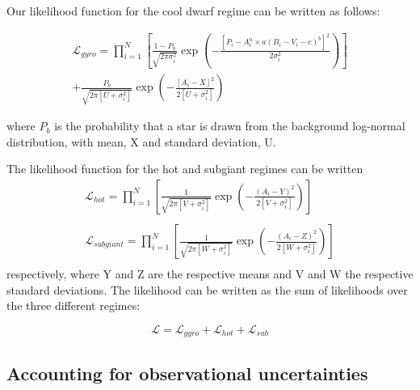 \documentclass[12pt,preprint]{aastex}
\begin{document}
Our likelihood function for the cool dwarf regime can be written as follows:


\begin{eqnarray}
	\mathcal{L}_{gyro} = \prod_{i=1}^N \left[ \frac{1-P_b}{\sqrt{2\pi\sigma_{i}^2}}
	\exp\left({-\frac{\left[P_i - A_i^n \times a(B_i-V_i-c)^b\right]^2}{2\sigma_{i}^2}} \right)  \right] \nonumber \\
	+ \frac{P_b}{\sqrt{2\pi[U+\sigma_{i}^2]}} \exp \left( -\frac{[A_i - X]^2}{2[U+\sigma_{i}^2]}  \right)
\end{eqnarray}
\label{eq:likelihood}

where $P_b$ is the probability that a star is drawn from the background log-normal distribution, with mean, X and standard deviation, U.

The likelihood function for the hot and subgiant regimes can be written
\begin{eqnarray}
	\mathcal{L}_{hot} = \prod_{i=1}^N \left[ \frac{1}{\sqrt{2\pi[V+\sigma_{i}^2]}}
	\exp\left({-\frac{\left(A_{i}- Y\right)^2} {2[V+\sigma_{i}^2]}} \right)  \right] \\
	\nonumber \\
	\mathcal{L}_{subgiant} = \prod_{i=1}^N \left[ \frac{1}{\sqrt{2\pi[W+\sigma_{i}^2]}}
	\exp\left({-\frac{\left(A_{i}- Z\right)^2} {2[W+\sigma_{i}^2]}} \right)  \right] \nonumber \\
\end{eqnarray}
respectively, where Y and Z are the respective means and V and W the respective standard deviations.
The likelihood can be written as the sum of likelihoods over the three different regimes:%

\begin{equation}
	\mathcal{L} = \mathcal{L}_{gyro} + \mathcal{L}_{hot} + \mathcal{L}_{sub}
\end{equation}

\subsection{Accounting for observational uncertainties}
\end{document}
